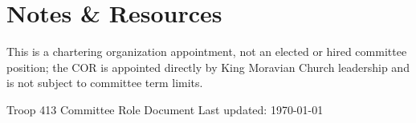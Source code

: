 \documentclass[11pt, letterpaper]{article}
\begin{document}
\vspace{0.6em}

\section{Notes \& Resources}
This is a chartering organization appointment, not an elected or hired committee position; the COR is appointed directly by King Moravian Church leadership and is not subject to committee term limits.

\vfill
\begin{center}
  \footnotesize\color{gray}
  Troop 413 \textbullet{} Committee Role Document \textbullet{} Last updated: \today
\end{center}
\end{document}
